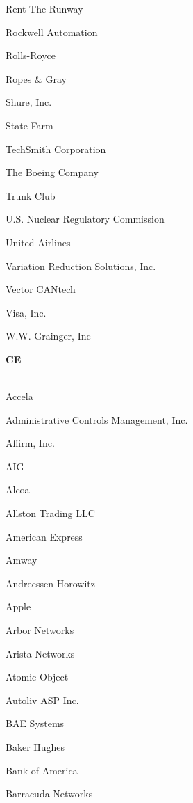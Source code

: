 \documentclass[twoside]{article}
\begin{document}
\begin{center}
\begin{multicols}{5}
\begin{FlushLeft}
\begin{compactitem}
\item Rent The Runway
\item Rockwell Automation
\item Rolls-Royce
\item Ropes \& Gray
\item Shure, Inc.
\item State Farm
\item TechSmith Corporation
\item The Boeing Company
\item Trunk Club
\item U.S. Nuclear Regulatory Commission
\item United Airlines
\item Variation Reduction Solutions, Inc.
\item Vector CANtech
\item Visa, Inc.
\item W.W. Grainger, Inc
\end{compactitem}
        \end{FlushLeft}
        \vspace{1em}
        {\fontsize{14}{16}\selectfont \bf CE}\\
        \vspace{-1em}
        ~\hrulefill~
        \vspace{-.9em}
        \begin{FlushLeft}
        \begin{compactitem}
        \item Accela
\item Administrative Controls Management, Inc.
\item Affirm, Inc.
\item AIG
\item Alcoa
\item Allston Trading LLC
\item American Express
\item Amway
\item Andreessen Horowitz
\item Apple
\item Arbor Networks
\item Arista Networks
\item Atomic Object
\item Autoliv ASP Inc.
\item BAE Systems
\item Baker Hughes
\item Bank of America
\item Barracuda Networks

\end{compactitem}
\end{FlushLeft}
\end{multicols}
\end{center}
\end{document}
